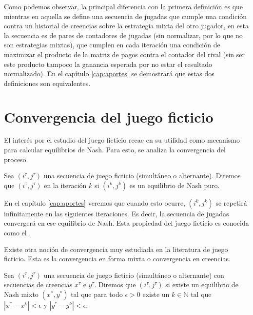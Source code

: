 Como podemos observar, la principal diferencia con la primera definición es que mientras en aquella se define una secuencia de jugadas que cumple una condición contra un historial de creencias sobre la estrategia mixta del otro jugador, en esta la secuencia es de pares de contadores de jugadas (sin normalizar, por lo que no son estrategias mixtas), que cumplen en cada iteración una condición de maximizar el producto de la matriz de pagos contra el contador del rival (sin ser este producto tampoco la ganancia esperada por no estar el resultado normalizado). En el capítulo \ref{cap:aportes} se demostrará que estas dos definiciones son equivalentes.

\section{Convergencia del juego ficticio}

El interés por el estudio del juego ficticio recae en su utilidad como mecanismo para calcular equilibrios de Nash. Para esto, se analiza la convergencia del proceso.

\begin{definition}

    Sea $(i^\tau, j^\tau)$ una secuencia de juego ficticio (simultáneo o alternante). Diremos que $(i^\tau, j^\tau)$  en la iteración $k$ si $(i^k, j^k)$ es un equilibrio de Nash puro.

\end{definition}

En el capítulo \ref{cap:aportes} veremos que cuando esto ocurre, $(i^k, j^k)$ se repetirá infinitamente en las siguientes iteraciones. Es decir, la secuencia de jugadas convergerá en ese equilibrio de Nash. Esta propiedad del juego ficticio es conocida como el .


Existe otra noción de convergencia muy estudiada en la literatura de juego ficticio. Esta es la convergencia en forma mixta o convergencia en creencias.

\begin{definition}
    Sea $(i^\tau, j^\tau)$ una secuencia de juego ficticio (simultáneo o alternante) con secuencias de creencias $x^\tau$ e $y^\tau$. Diremos que $(i^\tau, j^\tau)$  si existe un equilibrio de Nash mixto $(x^*, y^*)$ tal que para todo $\epsilon > 0$ existe un $k \in \mathbb{N}$ tal que $|x^* - x^k| < \epsilon$ y $|y^* - y^k| < \epsilon$.
\end{definition}

